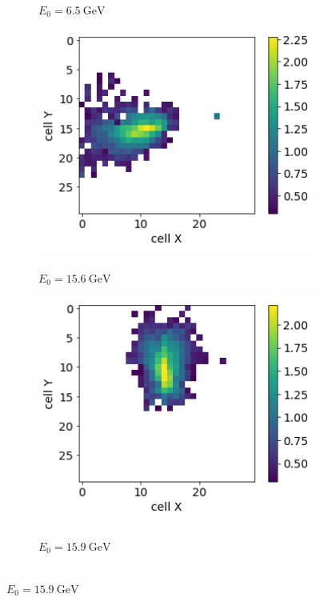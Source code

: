 \begin{figure}
\begin{subfigure}{0.24\textwidth}
    \caption{\\$E_0 = 6.5~\text{GeV}$ }%
  \end{subfigure}
    \begin{subfigure}{0.24\textwidth}
    \centering
    \includegraphics[width=1\textwidth]{figures/3_gen.png}
    \caption{\\$E_0 = 15.6~\text{GeV}$ }%
  \end{subfigure}
  \begin{subfigure}{0.24\textwidth}
    \centering
    \includegraphics[width=1\textwidth]{figures/4_gen.png}
    \caption{\\$E_0 = 15.9~\text{GeV}$ }%
  \end{subfigure}
 

\end{figure}
